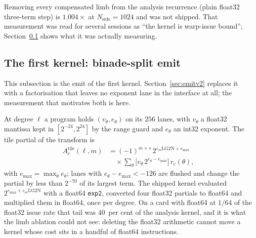 \documentclass[usenatbib,useAMS]{mnras}
\begin{document}
Removing every compensated limb from the analysis recurrence (plain float32 three-term step) is $1.004\times$ at $N_{\mathrm{side}}=1024$ and was not shipped. That measurement was read for several sessions as ``the kernel is warp-issue bound''; Section~\ref{sec:emit} shows what it was actually measuring.

\subsection{The first kernel: binade-split emit}
\label{sec:emit}

This subsection is the emit of the first kernel. Section~\ref{sec:emitv2} replaces it with a factorisation that leaves no exponent lane in the interface at all; the measurement that motivates both is here.

At degree $\ell$ a program holds $(v_\theta,e_\theta)$ on its $256$ lanes, with $v_\theta$ a float32 mantissa kept in $[2^{-24},2^{24}]$ by the range guard and $e_\theta$ an int32 exponent. The tile partial of the transform is
\begin{equation}
\label{eq:tile}
\begin{split}
A^{\mathrm{tile}}_c(\ell,m)
&=(-1)^{m+s}\,2^{\varepsilon_m\mathrm{LG2N}+e_{\max}}\\
&\quad\times\sum_\theta\bigl[v_\theta\,2^{e_\theta-e_{\max}}\bigr]\,r_c(\theta),
\end{split}
\end{equation}
with $e_{\max}=\max_\theta e_\theta$; lanes with $e_\theta-e_{\max}<-126$ are flushed and change the partial by less than $2^{-70}$ of its largest term. The shipped kernel evaluated $2^{e_{\max}+\varepsilon_m\mathrm{LG2N}}$ with a float64 \texttt{exp2}, converted four float32 partials to float64 and multiplied them in float64, once per degree. On a card with float64 at $1/64$ of the float32 issue rate that tail was $40$~per cent of the analysis kernel, and it is what the limb ablation could not see: deleting the float32 arithmetic cannot move a kernel whose cost sits in a handful of float64 instructions.
\end{document}
